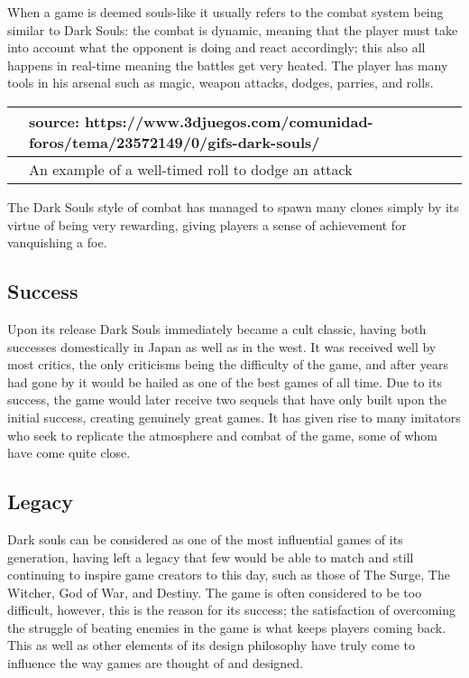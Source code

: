 \documentclass[a4paper,10pt]{book}
\begin{document}
 
          When a game is deemed souls-like it usually refers to the combat system being similar to Dark Souls: the combat is
          dynamic, meaning that the player must take into account what the opponent is doing and react accordingly; this also
          all happens in real-time meaning the battles get very heated. The player has many tools in his arsenal such as magic,
          weapon attacks, dodges, parries, and rolls.
           
 
 \begin{longtable}{p{1mm}|l|}\hline
 
 &   source: https://www.3djuegos.com/comunidad-foros/tema/23572149/0/gifs-dark-souls/  
 \\\hline
 
 & An example of a well-timed roll to dodge an attack 
 \\\hline
 \end{longtable}
 
        The Dark Souls style of combat has managed to spawn many clones simply by
        its virtue of being very rewarding, giving players a sense of achievement for vanquishing a foe.
         
 
 \subsection{Success }
 
          Upon its release Dark Souls immediately became a cult classic, having both successes domestically in
          Japan as well as in the west. It was received well by most critics, the only criticisms being the
          difficulty of the game, and after years had gone by it would be hailed as one of the best games of all
          time. Due to its success, the game would later receive two sequels that have only built upon the initial
          success, creating genuinely great games. It has given rise to many imitators who seek to replicate the
          atmosphere and combat of the game, some of whom have come quite close.
         
 
 \subsection{Legacy }
 
          Dark souls can be considered as one of the most influential games of its generation, having left a
          legacy that few would be able to match and still continuing to inspire game creators to this day, such
          as those of The Surge, The Witcher, God of War, and Destiny. The game is often considered to be too
          difficult, however, this is the reason for its success; the satisfaction of overcoming the struggle of
          beating enemies in the game is what keeps players coming back. This as well as other elements of its
          design philosophy have truly come to influence the way games are thought of and designed.
         
\end{document}
